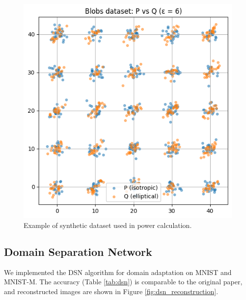\documentclass{article}
\begin{document}
\begin{figure}
\begin{minipage}{0.25\textwidth}
    \centering
    \includegraphics[width=\textwidth]{MMD/Example.png}
    \caption{Example of synthetic dataset used in power calculation.}
    \label{fig:mmd_example}
  \end{minipage}
  

\end{figure}

\subsection{Domain Separation Network}
We implemented the DSN algorithm for domain adaptation on MNIST and MNIST-M. The accuracy (Table \ref{tab:dsn}) is comparable to the original paper, and reconstructed images are shown in Figure \ref{fig:dsn_reconstruction}.
\end{document}
